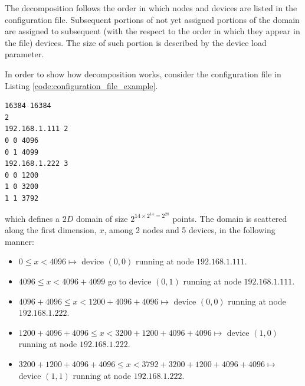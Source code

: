 The decomposition follows the order in which nodes and devices are listed in the configuration file. Subsequent portions of not yet assigned portions of the domain are assigned to subsequent (with the respect to the order in which they appear in the file) devices. The size of such portion is described by the device load parameter.

 In order to show how decomposition works, consider the  configuration file in Listing \ref{code:configuration_file_example}.
 \begin{minipage}{\linewidth}
\begin{lstlisting}
16384 16384
2
192.168.1.111 2  
0 0 4096
0 1 4099
192.168.1.222 3
0 0 1200
1 0 3200
1 1 3792
\end{lstlisting}
\end{minipage}
which defines a $2D$ domain of size $2^{{14} \times 2^{{14}} = 2^{28}}$ points.
The domain is scattered along the first dimension, $x$, among 2 nodes and 5 devices, in the following manner:
\begin{itemize}
	\item $0 \leq x < 4096 \longmapsto$  device $(0,0)$ running at node $192.168.1.111$.
	\item  $4096 \leq x < 4096+4099$ go to device $(0,1)$ running at node $192.168.1.111$.
	
	\item  $4096+4096\leq x < 1200+4096+4096 \longmapsto$  device $(0,0)$ running at node $192.168.1.222$.
	\item  $1200+4096+4096\leq x < 3200+1200+4096+4096 \longmapsto$  device $(1,0)$ running at node $192.168.1.222$.
	\item  $3200+1200+4096+4096\leq x < 3792+3200+1200+4096+4096 \longmapsto$  device $(1,1)$ running at node $192.168.1.222$.
\end{itemize}



